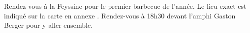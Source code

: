 Rendez vous à la Feyssine pour le premier barbecue de l'année. Le lieu exact est
indiqué sur la carte en annexe . Rendez-vous à 18h30 devant l'amphi Gaston
Berger pour y aller ensemble.

